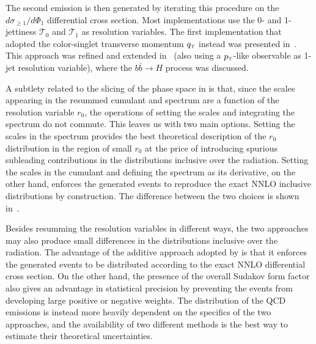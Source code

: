 \documentclass[11pt,a4paper]{article}
\begin{document}
The second emission is then generated by iterating this procedure on
the $d\sigma_{\geq 1} / d\Phi_1$ differential cross section. Most
\GENEVA{} implementations use the 0- and 1-jettiness $\mathcal{T}_0$
and $\mathcal{T}_1$ as resolution variables. The first implementation
that adopted the color-singlet transverse momentum
$q_{\scriptscriptstyle\rm T}$ instead was presented
in~\cite{alioli:2021qbf}. This approach was refined and extended
in~\cite{Gavardi:2025zpf} (also using a $p_{\scriptscriptstyle\rm
  T}$-like observable as 1-jet resolution variable), where the $b
\bar{b} \to H$ process was discussed.

A subtlety related to the slicing of the phase space in \GENEVA{} is
that, since the scales appearing in the resummed cumulant and spectrum
are a function of the resolution variable $r_0$, the operations of
setting the scales and integrating the spectrum do not commute. This
leaves us with two main options. Setting the scales in the spectrum
provides the best theoretical description of the $r_0$ distribution in
the region of small $r_0$ at the price of introducing spurious
subleading contributions in the distributions inclusive over the
radiation. Setting the scales in the cumulant and defining the
spectrum as its derivative, on the other hand, enforces the generated
events to reproduce the exact NNLO inclusive distributions by
construction. The difference between the two choices is shown
in~.

Besides resumming the resolution variables in different ways, the two
approaches may also produce small differences in the distributions
inclusive over the radiation. The advantage of the additive approach
adopted by \GENEVA{} is that it enforces the generated events to be
distributed according to the exact NNLO differential cross section.
On the other hand, the presence of the overall Sudakov form factor also gives \minnlo{} 
an advantage in statistical precision by
preventing the events from developing large positive or negative
weights. The distribution of the QCD emissions is instead more heavily
dependent on the specifics of the two approaches, and the availability
of two different methods is the best way to estimate their theoretical
uncertainties.
\end{document}
